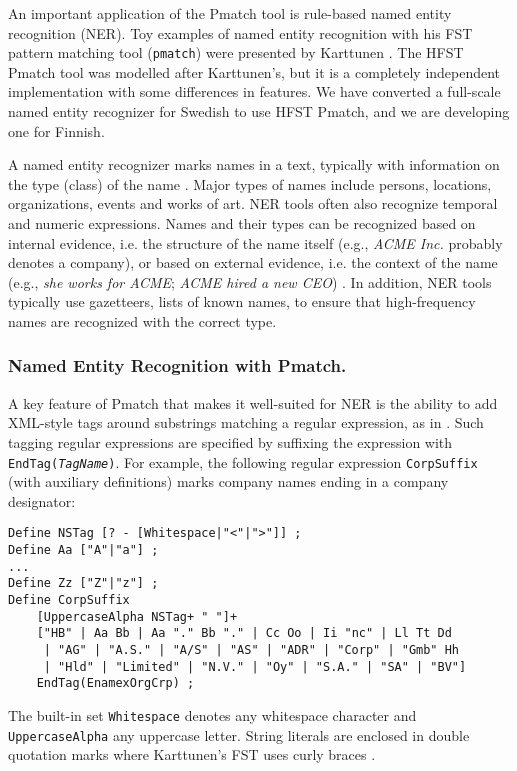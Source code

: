 \documentclass{llncs}
\begin{document}
An important application of the Pmatch tool is rule-based named entity
recognition (NER). Toy examples of named entity recognition with
his FST pattern matching tool (\texttt{pmatch}) were presented by Karttunen
\cite{karttunen/2011}. The HFST Pmatch tool was modelled after
Karttunen's, but it is a completely independent implementation with
some differences in features. We have
converted a full-scale named entity recognizer for Swedish to use
HFST Pmatch, and we are developing one for Finnish.

A named entity recognizer marks names in a text, typically with
information on the type (class) of the name \cite{nadeau/2007}. Major
types of names include persons, locations, organizations, events and
works of art. NER tools often also recognize temporal and numeric
expressions. Names and their types can be recognized based on internal
evidence, i.e. the structure of the name itself (e.g., \textit{ACME
  Inc.} probably denotes a company), or based on external evidence,
i.e. the context of the name (e.g., \textit{she works for ACME};
\textit{ACME hired a new CEO}) \cite{mcdonald/1996}. In
addition, NER tools typically use gazetteers, lists of known names, to
ensure that high-frequency names are recognized with the correct type.

\subsubsection{Named Entity Recognition with Pmatch.}

A key feature of Pmatch that makes it well-suited for NER is the ability
to add XML-style tags around substrings matching a regular expression,
as in \cite{karttunen/2011}. Such tagging regular expressions are
specified by suffixing the expression with
\texttt{EndTag(\textit{TagName})}. For example, the following regular
expression \texttt{CorpSuffix} (with auxiliary definitions) marks
company names ending in a company designator:

\begin{verbatim}
Define NSTag [? - [Whitespace|"<"|">"]] ;
Define Aa ["A"|"a"] ;
...
Define Zz ["Z"|"z"] ;
Define CorpSuffix
    [UppercaseAlpha NSTag+ " "]+
    ["HB" | Aa Bb | Aa "." Bb "." | Cc Oo | Ii "nc" | Ll Tt Dd
     | "AG" | "A.S." | "A/S" | "AS" | "ADR" | "Corp" | "Gmb" Hh
     | "Hld" | "Limited" | "N.V." | "Oy" | "S.A." | "SA" | "BV"]
    EndTag(EnamexOrgCrp) ;
\end{verbatim}

\noindent
\begin{sloppypar}
The built-in set \texttt{Whitespace} denotes any whitespace character
and \texttt{UppercaseAlpha} any uppercase letter. String literals are
enclosed in double quotation marks where Karttunen's FST uses curly braces
\cite{karttunen/2011}.
\end{sloppypar}
\end{document}
